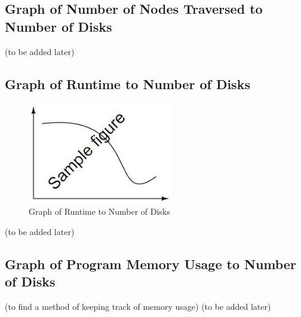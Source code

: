 \documentclass[conference]{IEEEtran}
\begin{document}
\subsection{Graph of Number of Nodes Traversed to Number of Disks}

(to be added later)

\subsection {Graph of Runtime to Number of Disks}

\begin{figure}
\centering
\includegraphics[width=2.5in]{samplefig}
\caption{Graph of Runtime to Number of Disks}
\label{fig:my_label}
\end{figure}

(to be added later)

\subsection{Graph of Program Memory Usage to Number of Disks}
(to find a method of keeping track of memory usage)
(to be added later)


%
\end{document}
